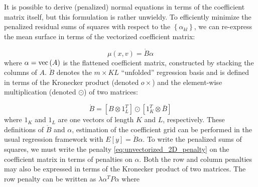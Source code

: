 \documentclass[12pt]{article}
\theoremstyle{definition}
\begin{document}

It is possible to derive (penalized) normal equations in terms of the coefficient matrix itself, but this formulation is rather unwieldy. To efficiently minimize the penalized residual sums of squares with respect to the $\left\{ \alpha_{kl} \right\}$, we can re-express the mean surface in terms of the vectorized coefficient matrix:

\begin{equation} \label{eq:vectorized_2D_TP_mean_surface}
\mu \left(x,v\right) = \mathring{B} \alpha
\end{equation}
\noindent
where $\alpha = \textup{vec}\left(A \right)$ is the flattened coefficient matrix, constructed by stacking the columns of $A$. $\mathring{B}$ denotes the $m \times KL$ ``unfolded'' regression basis and is defined in terms of the Kronecker product (denoted $o\times$) and the element-wise multiplication (denoted $\odot$) of two matrices:

\begin{equation} \label{eq:unfolded_2D_PS_basis}
\mathring{B} = \left[B \otimes 1^T_L \right] \odot \left[1^T_K \otimes \bar{B} \right]
\end{equation}
\noindent
where 
$1_K$ and $1_L$ are one vectors of length $K$ and $L$, respectively. These definitions of $\mathring{B}$ and $\alpha$, estimation of the coefficient grid can be performed in the usual regression framework with $E\left[ y\right] = \mathring{B}\alpha$. To write the penalized sums of squares, we must write the penalty \ref{eq:unvectorized_2D_penalty} on the coefficient matrix in terms of penalties on $\alpha$. Both the row and column penalties may also be expressed in terms of the Kronecker product of two matrices. The row penalty can be written as $\lambda \alpha^T P \alpha$ where
\end{document}
